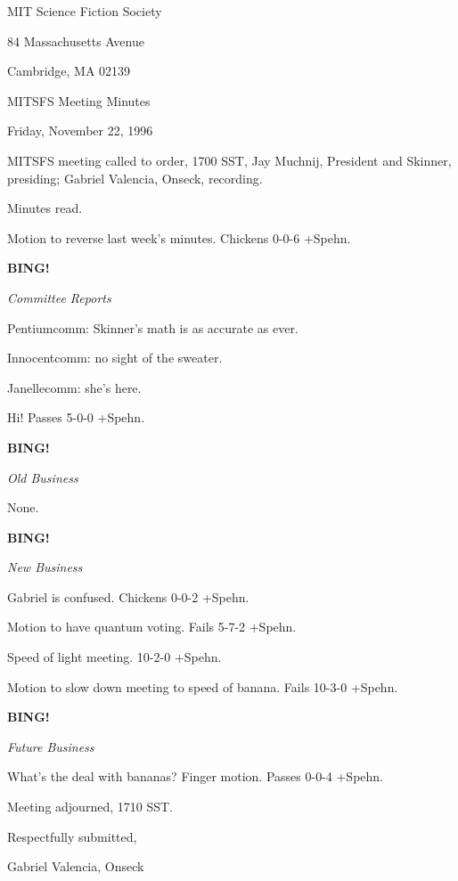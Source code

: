 \documentclass[12pt]{article}
\newcommand{\bing}{{\bf BING!} }
\newcommand{\goto}[1]{\bing \vskip 12pt \centerline{{\em{#1}}}}
\begin{document}
\begin{center}

MIT Science Fiction Society 

84 Massachusetts Avenue

Cambridge, MA 02139

\vspace{12pt}

MITSFS Meeting Minutes 

Friday, November 22, 1996

\end{center}
 
\vspace{18pt}

\setlength{\parskip}{6pt}

\noindent
MITSFS meeting called to order, 1700 SST,
Jay Muchnij, President and Skinner, presiding; Gabriel Valencia, Onseck, recording.

Minutes read.

Motion to reverse last week's minutes. Chickens 0-0-6 +Spehn.

\goto{Committee Reports}

Pentiumcomm: Skinner's math is as accurate as ever.

Innocentcomm: no sight of the sweater.

Janellecomm: she's here.

Hi! Passes 5-0-0 +Spehn.

\goto{Old Business}

None.

\goto{New Business}

Gabriel is confused. Chickens 0-0-2 +Spehn.

Motion to have quantum voting. Fails 5-7-2 +Spehn.

Speed of light meeting. 10-2-0 +Spehn.

Motion to slow down meeting to speed of banana. Fails 10-3-0 +Spehn.

\goto{Future Business}

What's the deal with bananas? Finger motion. Passes 0-0-4 +Spehn.

\vspace{12pt}

\noindent
Meeting adjourned, 1710 SST.

\vspace{18pt}

\centerline{Respectfully submitted,}
\centerline{Gabriel Valencia, Onseck}
\end{document}
